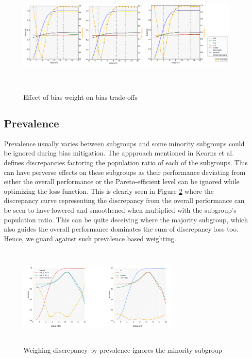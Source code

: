 \begin{figure}[htbp]
	\begin{center}
		\includegraphics[width=7.5in,height=2.4in]{bias_weight.png} 
        \setlength{\belowcaptionskip}{-8pt} 
		\caption{Effect of bias weight on bias trade-offs}
		\label{bias_weight}
	\end{center}
\end{figure}

\subsection{Prevalence}
Prevalence usually varies between subgroups and some minority subgroups could be ignored during bias mitigation. The appproach mentioned in Kearns et al. \cite{Kearns2017PreventingFG} defines discrepancies factoring the population ratio of each of the subgroups. This can have perverse effects on these subgroups as their performance deviating from either the overall performance or the Pareto-efficient level can be ignored while optimizing the loss function. This is clearly seen in Figure \ref{prevalence} where the discrepancy curve representing the discrepancy from the overall performance can be seen to have lowered and smoothened when multiplied with the subgroup's population ratio. This can be quite deceiving where the majority subgroup, which also guides the overall performance dominates the sum of discrepancy loss too. Hence, we guard against such prevalence based weighting.

\begin{figure}[htbp]
	\begin{center}
		\includegraphics[width=3.2in,height=2.0in]{prevalence.png} 
        \setlength{\belowcaptionskip}{-8pt} 
		\caption{Weighing discrepancy by prevalence ignores the minority subgroup}
		\label{prevalence}
	\end{center}
\end{figure}




 
 


